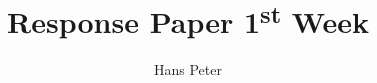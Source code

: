 \documentclass[12pt,runningheads]{article}
\begin{document}
\title{Response Paper 1\textsuperscript{st} Week}
\author{Hans Peter}
\maketitle


\printbibliography
\end{document}

